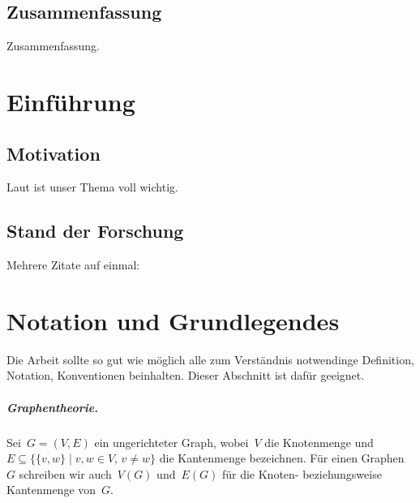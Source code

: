 \documentclass[a4paper,titlepage,onecolumn,twoside,12pt,ngerman,titlepage=firstiscover]{scrbook}
\theoremstyle{plain} %
\theoremstyle{definition} %
\theoremstyle{remark} %
\theoremstyle{plain}
\begin{document}
\section*{Zusammenfassung}
Zusammenfassung.

\newpage
\tableofcontents
\newpage

\chapter{Einführung}\label{chap:einfuehrung}


\newcommand{\vehiclecaps}{B}
\newcommand{\vehiclecap}{\beta}
\newcommand{\vehicetype}{v}
\newcommand{\soc}{q}
\newcommand{\places}{\mathcal{X}}
\newcommand{\depot}{\delta}
\newcommand{\depots}{D}
\newcommand{\trips}{\mathcal{T}}
\newcommand{\trip}{\tau}
\newcommand{\chargers}{\mathcal{C}}
\newcommand{\charges}{Z}
\newcommand{\timefunc}{T}
\newcommand{\energyfunc}{Q}
\newcommand{\numbervt}{m}
\newcommand{\chargefunc}{Q^C}
\newcommand{\charge}{\zeta}
\newcommand{\vehicleschedule}{\psi}
\newcommand{\schedule}{\Psi}
\newcommand{\evehicleschedule}{\omega}
\newcommand{\eschedule}{\Omega}
\newcommand{\departure}{d}
\newcommand{\arrival}{a}
\newcommand{\timestart}{s}
\newcommand{\timeend}{e}
\newcommand{\chargestation}{c}
\newcommand{\vehicletypes}{\mathcal{V}}




\section{Motivation}\label{sec:motivation}

Laut \citet{Nie06} ist unser Thema voll wichtig.

\section{Stand der Forschung}

Mehrere Zitate auf einmal: \citet{Nie06,GJ79,KN12}


\chapter{Notation und Grundlegendes}\label{ch:notation}

Die Arbeit sollte so gut wie möglich alle zum Verständnis notwendinge Definition, Notation, Konventionen beinhalten.
Dieser Abschnitt ist dafür geeignet.

\paragraph*{Graphentheorie.} 
Sei~$G=(V,E)$ ein ungerichteter Graph, wobei~$V$ die Knotenmenge und~$E\subseteq \{\{v,w\}\mid v,w\in V,\, v\neq w\}$ die Kantenmenge bezeichnen.
Für einen Graphen~$G$ schreiben wir auch~$V(G)$ und~$E(G)$ für die Knoten- beziehungsweise Kantenmenge von~$G$.
\end{document}
